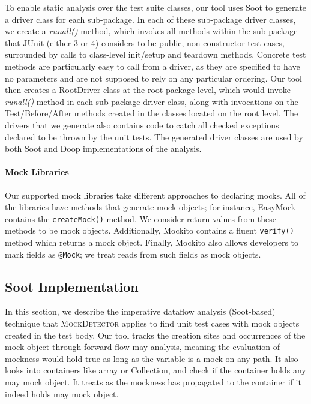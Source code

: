 To enable static analysis over the test suite classes, our tool uses Soot to generate a driver class for each sub-package. In each of these sub-package driver classes, we create a \textit{runall()} method, which invokes all methods within the sub-package that JUnit (either 3 or 4) considers to be public, non-constructor test cases, surrounded by calls to class-level init/setup and teardown methods. Concrete test methods are particularly easy to call from a driver, as they are specified to have no parameters and are not supposed to rely on any particular ordering. 
Our tool then creates a RootDriver class at the root package level, which would invoke \textit{runall()} method in each sub-package driver class, along with invocations on the Test/Before/After methods created in the classes located on the root level. The drivers that we generate also contains code to catch all checked exceptions declared to be thrown by the unit tests. The generated driver classes are used by both Soot and Doop implementations of the analysis.

\paragraph{Mock Libraries}
Our supported mock libraries take different approaches to declaring mocks. All of the libraries have methods that generate mock objects; for instance, EasyMock contains the \texttt{createMock()} method. We consider return values from these methods to be mock objects. Additionally, Mockito contains a fluent \texttt{verify()} method which returns a mock object. Finally, Mockito also allows developers to mark fields as \texttt{@Mock}; we treat reads from such fields as mock objects.

\subsection{Soot Implementation}
In this section, we describe the imperative dataflow analysis (Soot-based) technique that \textsc{MockDetector} applies to find unit test cases with mock objects created in the test body. Our tool tracks the creation sites and occurrences of the mock object through forward flow may analysis, meaning the evaluation of mockness would hold true as long as the variable is a mock on any path. It also looks into containers like array or Collection, and check if the container holds any may mock object. It treats as the mockness has propagated to the container if it indeed holds may mock object.

